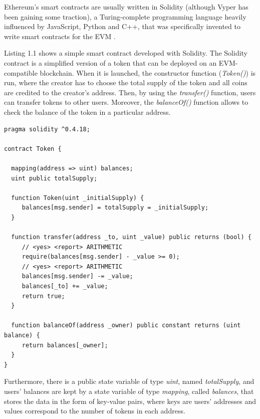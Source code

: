 \documentclass[runningheads]{llncs}
\begin{document}
Ethereum's smart contracts are usually written in Solidity (although Vyper has been gaining some traction), a Turing-complete programming language heavily influenced by JavaScript, Python and C++, that was specifically invented to write smart contracts for the EVM \cite{solidity}. 

Listing 1.1 \cite{smartbugs} shows a simple smart contract developed with Solidity. The Solidity contract is a simplified version of a token that can be deployed on an EVM-compatible blockchain. When it is launched, the constructor function (\textit{Token()}) is run, where the creator has to choose the total supply of the token and all coins are credited to the creator's address. Then, by using the \textit{transfer()} function, users can transfer tokens to other users. Moreover, the \textit{balanceOf()} function allows to check the balance of the token in a particular address.

\begin{lstlisting}[language=Solidity, caption=Solidity smart contract example \protect\cite{smartbugs}]
pragma solidity ^0.4.18;

contract Token {

  mapping(address => uint) balances;
  uint public totalSupply;

  function Token(uint _initialSupply) {
     balances[msg.sender] = totalSupply = _initialSupply;
  }

  function transfer(address _to, uint _value) public returns (bool) {
     // <yes> <report> ARITHMETIC
     require(balances[msg.sender] - _value >= 0);
     // <yes> <report> ARITHMETIC
     balances[msg.sender] -= _value;
     balances[_to] += _value;
     return true;
  }

  function balanceOf(address _owner) public constant returns (uint balance) {
     return balances[_owner];
  }
}
\end{lstlisting}

Furthermore, there is a public state variable of type \textit{uint}, named \textit{totalSupply}, and users' balances are kept by a state variable of type \textit{mapping}, called \textit{balances}, that stores the data in the form of key-value pairs, where keys are users' addresses and values correspond to the number of tokens in each address.
\end{document}
